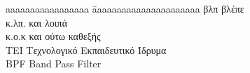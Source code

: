 
\newcommand{\abbrev}[2]{#1 \> #2\\ }
\begin{abbreviations}

\begin{tabbing}
  aaaaaaaaaaaaaaaaa \= aaaaaaaaaaaaaaaaaaaaaa\kill
  \abbrev{βλπ}{βλέπε}
  \abbrev{κ.λπ.}{και λοιπά}
  \abbrev{κ.ο.κ}{και ούτω καθεξής}
  \abbrev{ΤΕΙ}{Τεχνολογικό Εκπαιδευτικό Ίδρυμα}
  \abbrev{BPF}{Band Pass Filter}
\end{tabbing}
\end{abbreviations}